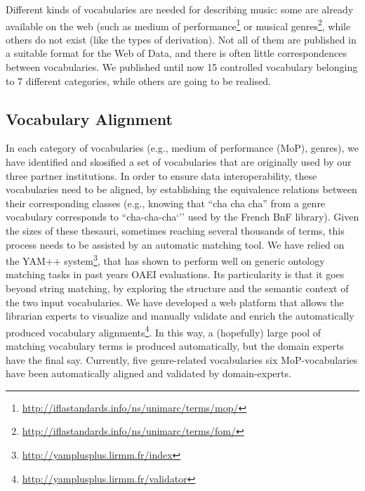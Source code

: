 \documentclass{article}
\begin{document}
Different kinds of vocabularies are needed for describing music: some are already available on the web (such as medium of performance\footnote{\url{http://iflastandards.info/ns/unimarc/terms/mop/}} or musical genres\footnote{\url{http://iflastandards.info/ns/unimarc/terms/fom/}}, while others do not exist (like the types of derivation). Not all of them are published in a suitable format for the Web of Data, and there is often little correspondences between vocabularies. We published until now 15 controlled vocabulary belonging to 7 different categories, while others are going to be realised. %

\subsection{Vocabulary Alignment}
In each category of vocabularies (e.g., medium of performance (MoP), genres), we have identified and skosified a set of vocabularies that are originally used by our three partner institutions. In order to ensure data interoperability, these vocabularies need to be aligned, by establishing the equivalence relations between their corresponding classes (e.g., knowing that ``cha cha cha'' from a genre vocabulary corresponds to ``cha-cha-cha`'' used by the French BnF library). Given the sizes of these thesauri, sometimes reaching several thousands of terms, this process needs to be assisted by an automatic matching tool. We have relied on the YAM++ system\footnote{\url{http://yamplusplus.lirmm.fr/index}}, that has shown to perform well on generic ontology matching tasks in past years OAEI evaluations. Its particularity is that it goes beyond string matching, by exploring the structure and the semantic context of the two input vocabularies. We have developed a web platform that allows the librarian experts to visualize and manually validate and enrich the automatically produced vocabulary alignments\footnote{\url{http://yamplusplus.lirmm.fr/validator}}. In this way, a (hopefully) large pool of matching vocabulary terms is produced automatically, but the domain experts have the final say. Currently, five genre-related vocabularies six MoP-vocabularies have been automatically aligned and validated by domain-experts.

\end{document}
